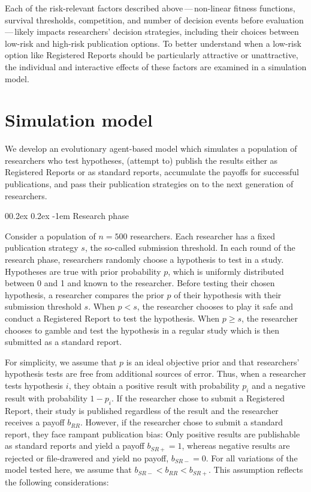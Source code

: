 \documentclass[
  ,man,mask,floatsintext]{apa6}
\makeatletter
\let\oldparagraph\paragraph
\renewcommand{\paragraph}[1]{\oldparagraph{#1}\mbox{}}
\renewcommand{\paragraph}{\@startsection{paragraph}{4}{\parindent}%
  {0\baselineskip \@plus 0.2ex \@minus 0.2ex}%
  {-1em}%
  {\normalfont\normalsize\bfseries\itshape\typesectitle}}
\makeatother
\begin{document}
Each of the risk-relevant factors described above\(\,\)---\(\,\)non-linear fitness functions, survival thresholds, competition, and number of decision events before evaluation\(\,\)---\(\,\)likely impacts researchers' decision strategies, including their choices between low-risk and high-risk publication options.
To better understand when a low-risk option like Registered Reports should be particularly attractive or unattractive, the individual and interactive effects of these factors are examined in a simulation model.

\hypertarget{simulation-model}{%
\section{Simulation model}\label{simulation-model}}

We develop an evolutionary agent-based model which simulates a population of researchers who test hypotheses, (attempt to) publish the results either as Registered Reports or as standard reports, accumulate the payoffs for successful publications, and pass their publication strategies on to the next generation of researchers.

\hypertarget{research-phase}{%
\paragraph{Research phase}\label{research-phase}}

Consider a population of \(n = 500\) researchers.
Each researcher has a fixed publication strategy \(s\), the so-called submission threshold.
In each round of the research phase, researchers randomly choose a hypothesis to test in a study.
Hypotheses are true with prior probability \(p\), which is uniformly distributed between 0 and 1 and known to the researcher.
Before testing their chosen hypothesis, a researcher compares the prior \(p\) of their hypothesis with their submission threshold \(s\).
When \(p < s\), the researcher chooses to play it safe and conduct a Registered Report to test the hypothesis.
When \(p \geq s\), the researcher chooses to gamble and test the hypothesis in a regular study which is then submitted as a standard report.

For simplicity, we assume that \(p\) is an ideal objective prior and that researchers' hypothesis tests are free from additional sources of error.
Thus, when a researcher tests hypothesis \(i\), they obtain a positive result with probability \(p_i\) and a negative result with probability \(1-p_i\).
If the researcher chose to submit a Registered Report, their study is published regardless of the result and the researcher receives a payoff \(b_{RR}\).
However, if the researcher chose to submit a standard report, they face rampant publication bias:
Only positive results are publishable as standard reports and yield a payoff \(b_{SR+} = 1\), whereas negative results are rejected or file-drawered and yield no payoff, \(b_{SR-} = 0\).
For all variations of the model tested here, we assume that \(b_{SR-} < b_{RR} < b_{SR+}\).
This assumption reflects the following considerations:
\end{document}
